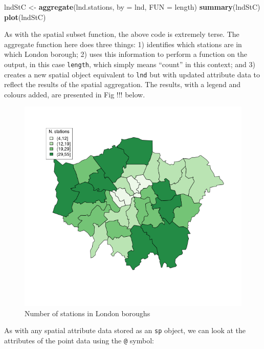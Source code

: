 \documentclass[]{article}
\makeatletter
\newenvironment{Shaded}{}{}
\newcommand{\KeywordTok}[1]{\textcolor[rgb]{0.00,0.44,0.13}{\textbf{{#1}}}}
\newcommand{\DataTypeTok}[1]{\textcolor[rgb]{0.56,0.13,0.00}{{#1}}}
\newcommand{\StringTok}[1]{\textcolor[rgb]{0.25,0.44,0.63}{{#1}}}
\newcommand{\NormalTok}[1]{{#1}}
\def\maxwidth{\ifdim\Gin@nat@width>\linewidth\linewidth
\else\Gin@nat@width\fi}
\let\Oldincludegraphics\includegraphics
\renewcommand{\includegraphics}[1]{\Oldincludegraphics[width=\maxwidth]{#1}}
\makeatother
\begin{document}
\begin{Shaded}
\begin{Highlighting}[]
\NormalTok{lndStC <-}\StringTok{ }\KeywordTok{aggregate}\NormalTok{(lnd.stations, }\DataTypeTok{by =} \NormalTok{lnd, }\DataTypeTok{FUN =} \NormalTok{length)}
\KeywordTok{summary}\NormalTok{(lndStC)}
\KeywordTok{plot}\NormalTok{(lndStC)}
\end{Highlighting}
\end{Shaded}

As with the spatial subset function, the above code is extremely terse.
The aggregate function here does three things: 1) identifies which
stations are in which London borough; 2) uses this information to
perform a function on the output, in this case \texttt{length}, which
simply means ``count'' in this context; and 3) creates a new spatial
object equivalent to \texttt{lnd} but with updated attribute data to
reflect the results of the spatial aggregation. The results, with a
legend and colours added, are presented in Fig !!! below.

\begin{figure}[htbp]
\centering
\includegraphics{figure/nStations.png}
\caption{Number of stations in London boroughs}
\end{figure}

As with any spatial attribute data stored as an \texttt{sp} object, we
can look at the attributes of the point data using the \texttt{@}
symbol:
\end{document}

